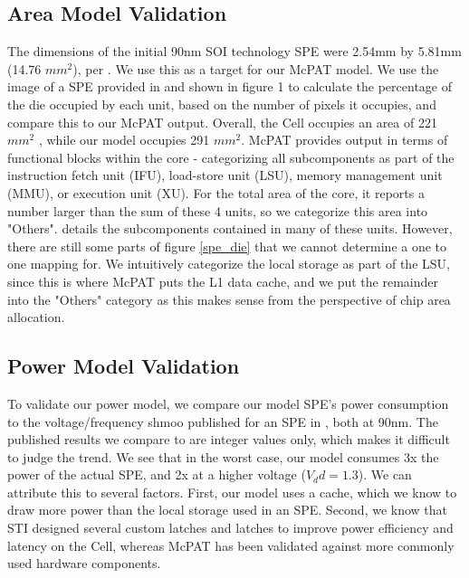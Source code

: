 \documentclass{sig-alternate-05-2015}
\begin{document}
\subsection{Area Model Validation}

The dimensions of the initial 90nm SOI technology SPE were 2.54mm by 5.81mm (14.76 $mm^2$), per \cite{flachs2006microarchitecture}. We use this as a target for our McPAT model. We use the image of a SPE provided in \cite{flachs2006microarchitecture}  and shown in figure 1 to calculate the percentage of the die occupied by each unit, based on the number of pixels it occupies, and compare this to our McPAT output. Overall, the Cell occupies an area of 221 $mm^2$ \cite{realworldtech} , while our model occupies 291 $mm^2$. McPAT provides output in terms of functional blocks within the core - categorizing all subcomponents as part of the instruction fetch unit (IFU), load-store unit (LSU), memory management unit (MMU), or execution unit (XU). For the total area of the core, it reports a number larger than the sum of these 4 units, so we categorize this area into "Others". \cite{li2009mcpat} details the subcomponents contained in many of these units. However, there are still some parts of figure \ref{spe_die} that we cannot determine a one to one mapping for. We intuitively categorize the local storage as part of the LSU, since this is where McPAT puts the L1 data cache, and we put the remainder into the "Others" category as this makes sense from the perspective of chip area allocation.

\subsection{Power Model Validation}

To validate our power model, we compare our model SPE's power consumption to the voltage/frequency shmoo published for an SPE in \cite{flachs2006microarchitecture}, both at 90nm. The published results we compare to are integer values only, which makes it difficult to judge the trend. We see that in the worst case, our model consumes 3x the power of the actual SPE, and 2x at a higher voltage ($V_dd = 1.3$). We can attribute this to several factors. First, our model uses a cache, which we know to draw more power than the local storage used in an SPE. Second, we know that STI designed several custom latches and latches \cite{pham2005design} to improve power efficiency and latency on the Cell, whereas McPAT has been validated against more commonly used hardware components.
\end{document}
